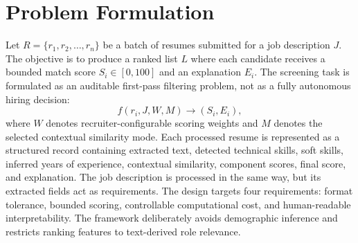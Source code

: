 \section{Problem Formulation}
Let \(R=\{r_1,r_2,\ldots,r_n\}\) be a batch of resumes submitted for a job description \(J\). The objective is to produce a ranked list \(L\) where each candidate receives a bounded match score \(S_i \in [0,100]\) and an explanation \(E_i\). The screening task is formulated as an auditable first-pass filtering problem, not as a fully autonomous hiring decision:
\begin{equation}
f(r_i,J,W,M) \rightarrow (S_i,E_i),
\end{equation}
where \(W\) denotes recruiter-configurable scoring weights and \(M\) denotes the selected contextual similarity mode. Each processed resume is represented as a structured record containing extracted text, detected technical skills, soft skills, inferred years of experience, contextual similarity, component scores, final score, and explanation. The job description is processed in the same way, but its extracted fields act as requirements. The design targets four requirements: format tolerance, bounded scoring, controllable computational cost, and human-readable interpretability. The framework deliberately avoids demographic inference and restricts ranking features to text-derived role relevance.
